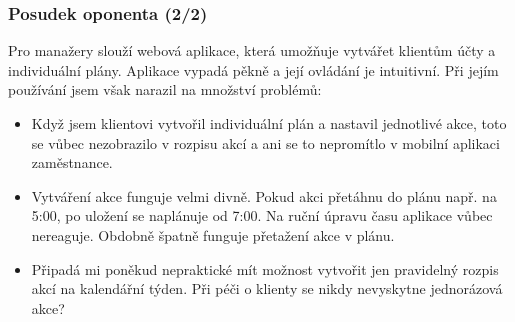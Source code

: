 \documentclass{beamer}
\begin{document}
\begin{frame}
\frametitle{Posudek oponenta (2/2)}
Pro manažery slouží webová aplikace, která umožňuje vytvářet klientům účty a individuální
plány. Aplikace vypadá pěkně a její ovládání je intuitivní. Při jejím používání jsem však
narazil na množství problémů:
\\[4mm]
\begin{itemize}
\item Když jsem klientovi vytvořil individuální plán a nastavil jednotlivé akce, toto se vůbec
nezobrazilo v rozpisu akcí a ani se to nepromítlo v mobilní aplikaci zaměstnance.
\item Vytváření akce funguje velmi divně. Pokud akci přetáhnu do plánu např. na 5:00, po
uložení se naplánuje od 7:00. Na ruční úpravu času aplikace vůbec nereaguje.
Obdobně špatně funguje přetažení akce v plánu.
\item Připadá mi poněkud nepraktické mít možnost vytvořit jen pravidelný rozpis akcí na
kalendářní týden. Při péči o klienty se nikdy nevyskytne jednorázová akce? 
\end{itemize}
\end{frame}

\end{document}
